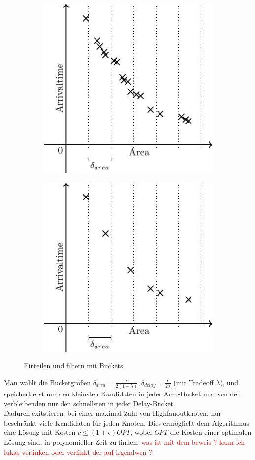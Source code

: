 \documentclass[11pt, a4paper, german]{article}
\begin{document}
\begin{figure}[h]
\centering
\begin{subfigure}{.5\textwidth}
  \centering
  \includegraphics[width=.7\linewidth]{pictures/compiled/tradeoff_kurve_buckets}
\end{subfigure}%
\begin{subfigure}{.5\textwidth}
  \centering
  \includegraphics[width=.7\linewidth]{pictures/compiled/tradeoff_kurve_filtered}
\end{subfigure}
\caption{Einteilen und filtern mit Buckets}
\label{bild:tradeoff_kurven_filtern}
\end{figure}
Man wählt die Bucketgrößen $\delta_{area} = \frac{\epsilon}{2(1-\lambda)}, \delta_{delay} = \frac{\epsilon}{2\lambda}$ (mit Tradeoff $\lambda$), und speichert erst nur den kleinsten Kandidaten in jeder Area-Bucket und von den verbleibenden nur den schnellsten in jeder Delay-Bucket.\\
Dadurch exitstieren, bei einer maximal Zahl von Highfanoutknoten, nur beschränkt viele Kandidaten für jeden Knoten. Dies ermöglicht dem  Algorithmus eine Lösung mit Kosten $c\leq (1+\epsilon)OPT$, wobei $OPT$ die Kosten einer optimalen Lösung sind, in polynomieller Zeit zu finden.
\textcolor{red}{was ist mit dem beweis ? kann ich lukas verlinken oder verlinkt der auf irgendwen ?}
\end{document}
